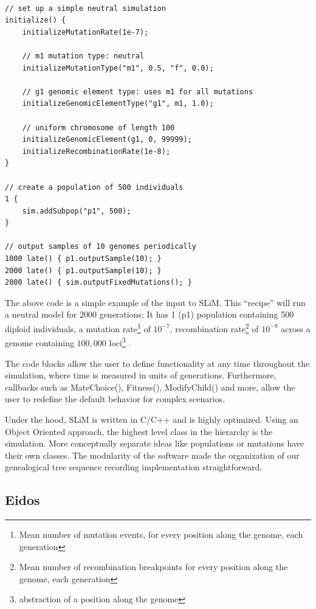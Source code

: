 \documentclass{article}
\begin{document}
\begin{lstlisting}[basicstyle=\small,]

// set up a simple neutral simulation
initialize() {
	initializeMutationRate(1e-7);
	
	// m1 mutation type: neutral
	initializeMutationType("m1", 0.5, "f", 0.0);
	
	// g1 genomic element type: uses m1 for all mutations
	initializeGenomicElementType("g1", m1, 1.0);
	
	// uniform chromosome of length 100
	initializeGenomicElement(g1, 0, 99999);
	initializeRecombinationRate(1e-8);
}

// create a population of 500 individuals
1 {
	sim.addSubpop("p1", 500);
}

// output samples of 10 genomes periodically
1000 late() { p1.outputSample(10); }
2000 late() { p1.outputSample(10); }
2000 late() { sim.outputFixedMutations(); }

\end{lstlisting}

The above code is a simple example of the input to SLiM.
This ``recipe'' will run a neutral model for $2000$ generations;
It has 1 (p1) population containing 500 diploid individuals, 
a mutation rate\footnote{Mean number of mutation events, for every position along the genome, each generation}
of $10^{-7}$, recombination rate\footnote{Mean number of recombination breakpoints for every position along the genome, each generation}
of $10^{-8}$ across a genome containing $100,000$ loci\footnote{abstraction of a position along the genome} . 

The code blocks allow the user to define functionality at any time throughout the simulation, 
where time is measured in units of generations. 
Furthermore, callbacks such as MateChoice(), Fitness(), ModifyChild() and more,
allow the user to redefine the default behavior for complex scenarios. 

Under the hood, SLiM is written in C/C++ and is highly optimized. 
Using an Object Oriented approach, the highest level class in the hierarchy is the simulation.
More conceptually separate ideas like populations or mutations have their own classes. 
The modularity of the software made the organization of our genealogical tree sequence recording implementation straightforward.

\subsection{Eidos}
\end{document}
